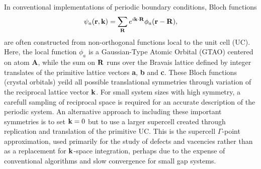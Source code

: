 \commentoutA{\documentclass[prb,aps,twocolumn,showpacs,twocolumngrid,superbib]{revtex4}}
\begin{document}
In conventional implementations of periodic boundary conditions, 
Bloch functions 
\begin{equation}
\psi_a({\bf r},{\bf k})  =  \sum_{\bf R} e^{i {\bf k}\cdot {\bf R}} \phi_a ({\bf r}-{\bf R}),
\end{equation}
are often constructed from non-orthogonal functions local to the unit cell (UC). Here, the local function
$\phi_a$ is a Gaussian-Type Atomic Orbital (GTAO) centered on atom {\bf A}, while the 
sum on $\bf R$ runs over the Bravais lattice defined by integer translates of the primitive 
lattice vectors {\bf a}, {\bf b} and {\bf  c}.   These Bloch functions (crystal orbitals)
yeild all possible translational symmetries through variation of the reciprocal lattice vector $\bf k$.     
For small system sizes with high symmetry, a carefull sampling of reciprocal space is required 
for an accurate description of the periodic system.  An alternative approach to including these
important symmetries is to set ${\bf k}=0$ but to use a larger supercell created through replication 
and translation of the primitive UC.  This is the supercell $\Gamma$-point approximation, used
primarily for the study of defects and vacencies rather than as a replacement for $\bf k$-space integration,
perhaps due to the expense of conventional algorithms and slow convergence for small gap systems.

\pagebreak
\end{document}

